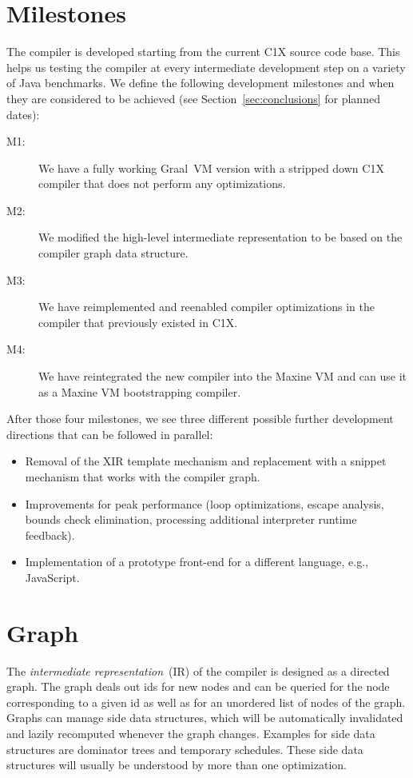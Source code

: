 \documentclass[twocolumn]{svjour3}
\begin{document}
\section{Milestones}
\label{sec:mile}
The compiler is developed starting from the current C1X source code base.
This helps us testing the compiler at every intermediate development step on a variety of Java benchmarks.
We define the following development milestones and when they are considered to be achieved (see Section~\ref{sec:conclusions} for planned dates):
\begin{description}
\item[M1:] We have a fully working Graal~VM version with a stripped down C1X compiler that does not perform any optimizations.
\item[M2:] We modified the high-level intermediate representation to be based on the compiler graph data structure.
\item[M3:] We have reimplemented and reenabled compiler optimizations in the compiler that previously existed in C1X.
\item[M4:] We have reintegrated the new compiler into the Maxine VM and can use it as a Maxine VM bootstrapping compiler.
\end{description}

After those four milestones, we see three different possible further development directions that can be followed in parallel:
\begin{itemize}
  \item Removal of the XIR template mechanism and replacement with a snippet mechanism that works with the compiler graph.
  \item Improvements for peak performance (loop optimizations, escape analysis, bounds check elimination, processing additional interpreter runtime feedback).
  \item Implementation of a prototype front-end for a different language, e.g., JavaScript.
\end{itemize}

\section{Graph}

The \emph{intermediate representation}~(IR) of the compiler is designed as a directed graph.
The graph deals out ids for new nodes and can be queried for the node corresponding to a given id as well as for an unordered list of nodes of the graph.
Graphs can manage side data structures, which will be automatically invalidated and lazily recomputed whenever the graph changes. Examples for side data structures are dominator trees and temporary schedules. These side data structures will usually be understood by more than one optimization.
\end{document}
